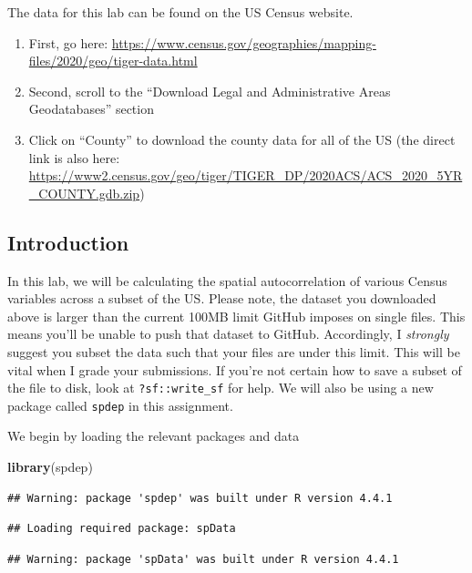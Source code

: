 \documentclass[]{article}
\newenvironment{Shaded}{\begin{snugshade}}{\end{snugshade}}
\newcommand{\FunctionTok}[1]{\textcolor[rgb]{0.13,0.29,0.53}{\textbf{#1}}}
\newcommand{\NormalTok}[1]{#1}
\begin{document}
The data for this lab can be found on the US Census website.

\begin{enumerate}
\def\labelenumi{\arabic{enumi}.}
\item
  First, go here:
  \url{https://www.census.gov/geographies/mapping-files/2020/geo/tiger-data.html}
\item
  Second, scroll to the ``Download Legal and Administrative Areas
  Geodatabases'' section
\item
  Click on ``County'' to download the county data for all of the US (the
  direct link is also here:
  \url{https://www2.census.gov/geo/tiger/TIGER_DP/2020ACS/ACS_2020_5YR_COUNTY.gdb.zip})
\end{enumerate}

\subsection{Introduction}\label{introduction}

In this lab, we will be calculating the spatial autocorrelation of
various Census variables across a subset of the US. Please note, the
dataset you downloaded above is larger than the current 100MB limit
GitHub imposes on single files. This means you'll be unable to push that
dataset to GitHub. Accordingly, I \emph{strongly} suggest you subset the
data such that your files are under this limit. This will be vital when
I grade your submissions. If you're not certain how to save a subset of
the file to disk, look at \texttt{?sf::write\_sf} for help. We will also
be using a new package called \texttt{spdep} in this assignment.

We begin by loading the relevant packages and data

\begin{Shaded}
\begin{Highlighting}[]
\FunctionTok{library}\NormalTok{(spdep)}
\end{Highlighting}
\end{Shaded}

\begin{verbatim}
## Warning: package 'spdep' was built under R version 4.4.1
\end{verbatim}

\begin{verbatim}
## Loading required package: spData
\end{verbatim}

\begin{verbatim}
## Warning: package 'spData' was built under R version 4.4.1
\end{verbatim}
\end{document}
